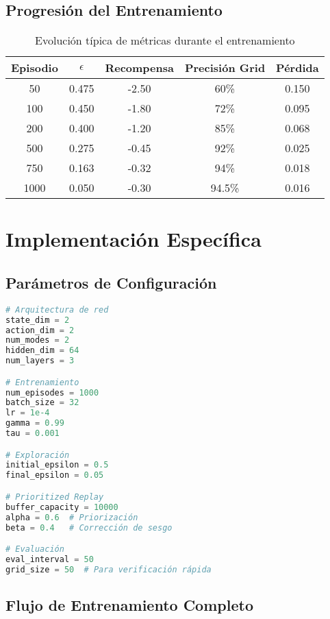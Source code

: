 \documentclass[12pt,a4paper]{article}
\begin{document}
\subsection{Progresión del Entrenamiento}

\begin{table}[h]
\centering
\begin{tabular}{|c|c|c|c|c|}
\hline
\textbf{Episodio} & \textbf{$\epsilon$} & \textbf{Recompensa} & \textbf{Precisión Grid} & \textbf{Pérdida} \\
\hline
50 & 0.475 & -2.50 & 60\% & 0.150 \\
100 & 0.450 & -1.80 & 72\% & 0.095 \\
200 & 0.400 & -1.20 & 85\% & 0.068 \\
500 & 0.275 & -0.45 & 92\% & 0.025 \\
750 & 0.163 & -0.32 & 94\% & 0.018 \\
1000 & 0.050 & -0.30 & 94.5\% & 0.016 \\
\hline
\end{tabular}
\caption{Evolución típica de métricas durante el entrenamiento}
\end{table}

\section{Implementación Específica}

\subsection{Parámetros de Configuración}

\begin{lstlisting}[language=Python, frame=single, caption=Configuración HNAF]
# Arquitectura de red
state_dim = 2
action_dim = 2
num_modes = 2
hidden_dim = 64
num_layers = 3

# Entrenamiento
num_episodes = 1000
batch_size = 32
lr = 1e-4
gamma = 0.99
tau = 0.001

# Exploración
initial_epsilon = 0.5
final_epsilon = 0.05

# Prioritized Replay
buffer_capacity = 10000
alpha = 0.6  # Priorización
beta = 0.4   # Corrección de sesgo

# Evaluación
eval_interval = 50
grid_size = 50  # Para verificación rápida
\end{lstlisting}

\subsection{Flujo de Entrenamiento Completo}
\end{document}
